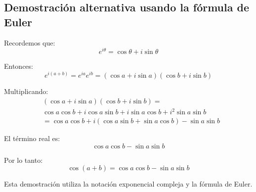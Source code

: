 \subsection*{Demostración alternativa usando la fórmula de Euler}
Recordemos que:
\begin{equation*}
e^{i\theta} = \cos\theta + i\sin\theta
\end{equation*}

Entonces:
\begin{equation*}
e^{i(a+b)} = e^{ia} e^{ib} = (\cos a + i \sin a)(\cos b + i \sin b)
\end{equation*}

Multiplicando:
\begin{align*}
& (\cos a + i \sin a)(\cos b + i \sin b) = \\
& \cos a \cos b + i \cos a \sin b + i \sin a \cos b + i^2 \sin a \sin b \\
& = \cos a \cos b + i(\cos a \sin b + \sin a \cos b) - \sin a \sin b
\end{align*}

El término real es:
\begin{equation*}
\cos a \cos b - \sin a \sin b
\end{equation*}

Por lo tanto:
\begin{equation*}
\cos(a+b) = \cos a \cos b - \sin a \sin b
\end{equation*}

Esta demostración utiliza la notación exponencial compleja y la fórmula de Euler.
